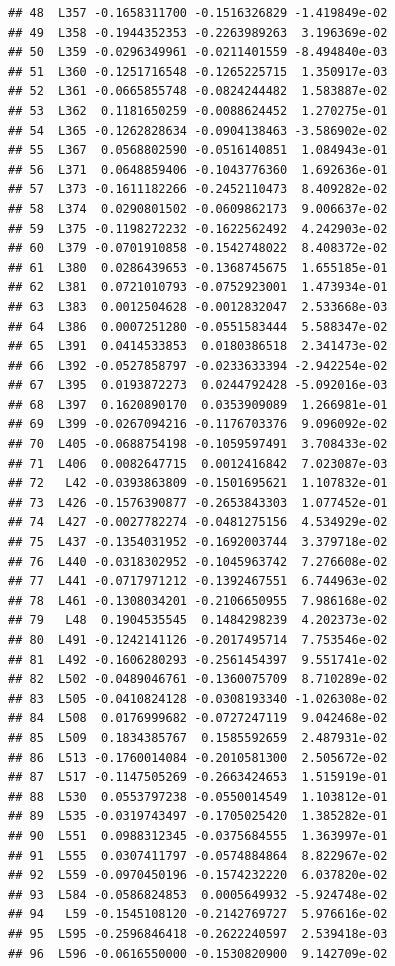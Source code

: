 \documentclass[
]{article}
\begin{document}
\begin{verbatim}
## 48  L357 -0.1658311700 -0.1516326829 -1.419849e-02
## 49  L358 -0.1944352353 -0.2263989263  3.196369e-02
## 50  L359 -0.0296349961 -0.0211401559 -8.494840e-03
## 51  L360 -0.1251716548 -0.1265225715  1.350917e-03
## 52  L361 -0.0665855748 -0.0824244482  1.583887e-02
## 53  L362  0.1181650259 -0.0088624452  1.270275e-01
## 54  L365 -0.1262828634 -0.0904138463 -3.586902e-02
## 55  L367  0.0568802590 -0.0516140851  1.084943e-01
## 56  L371  0.0648859406 -0.1043776360  1.692636e-01
## 57  L373 -0.1611182266 -0.2452110473  8.409282e-02
## 58  L374  0.0290801502 -0.0609862173  9.006637e-02
## 59  L375 -0.1198272232 -0.1622562492  4.242903e-02
## 60  L379 -0.0701910858 -0.1542748022  8.408372e-02
## 61  L380  0.0286439653 -0.1368745675  1.655185e-01
## 62  L381  0.0721010793 -0.0752923001  1.473934e-01
## 63  L383  0.0012504628 -0.0012832047  2.533668e-03
## 64  L386  0.0007251280 -0.0551583444  5.588347e-02
## 65  L391  0.0414533853  0.0180386518  2.341473e-02
## 66  L392 -0.0527858797 -0.0233633394 -2.942254e-02
## 67  L395  0.0193872273  0.0244792428 -5.092016e-03
## 68  L397  0.1620890170  0.0353909089  1.266981e-01
## 69  L399 -0.0267094216 -0.1176703376  9.096092e-02
## 70  L405 -0.0688754198 -0.1059597491  3.708433e-02
## 71  L406  0.0082647715  0.0012416842  7.023087e-03
## 72   L42 -0.0393863809 -0.1501695621  1.107832e-01
## 73  L426 -0.1576390877 -0.2653843303  1.077452e-01
## 74  L427 -0.0027782274 -0.0481275156  4.534929e-02
## 75  L437 -0.1354031952 -0.1692003744  3.379718e-02
## 76  L440 -0.0318302952 -0.1045963742  7.276608e-02
## 77  L441 -0.0717971212 -0.1392467551  6.744963e-02
## 78  L461 -0.1308034201 -0.2106650955  7.986168e-02
## 79   L48  0.1904535545  0.1484298239  4.202373e-02
## 80  L491 -0.1242141126 -0.2017495714  7.753546e-02
## 81  L492 -0.1606280293 -0.2561454397  9.551741e-02
## 82  L502 -0.0489046761 -0.1360075709  8.710289e-02
## 83  L505 -0.0410824128 -0.0308193340 -1.026308e-02
## 84  L508  0.0176999682 -0.0727247119  9.042468e-02
## 85  L509  0.1834385767  0.1585592659  2.487931e-02
## 86  L513 -0.1760014084 -0.2010581300  2.505672e-02
## 87  L517 -0.1147505269 -0.2663424653  1.515919e-01
## 88  L530  0.0553797238 -0.0550014549  1.103812e-01
## 89  L535 -0.0319743497 -0.1705025420  1.385282e-01
## 90  L551  0.0988312345 -0.0375684555  1.363997e-01
## 91  L555  0.0307411797 -0.0574884864  8.822967e-02
## 92  L559 -0.0970450196 -0.1574232220  6.037820e-02
## 93  L584 -0.0586824853  0.0005649932 -5.924748e-02
## 94   L59 -0.1545108120 -0.2142769727  5.976616e-02
## 95  L595 -0.2596846418 -0.2622240597  2.539418e-03
## 96  L596 -0.0616550000 -0.1530820900  9.142709e-02

\end{verbatim}
\end{document}
